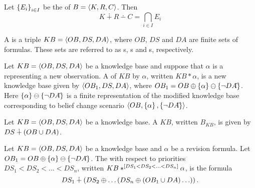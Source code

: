 \begin{defi}
Let $\left\{ E_i\right\}_{i\in I}$ be the  of $B=\left\langle K,R,C\right\rangle$. Then
\begin{equation}
K\dotplus R\dotminus C=\displaystyle\bigcap_{i\in I}E_i
\end{equation}
\cite{conf/fedcsis/KorpusikLM12}
\end{defi}

\begin{defi}
A  is a triple $KB=\left\langle OB,DS,DA\right\rangle$, where $OB$, $DS$ and $DA$ are finite sets of formulas. These sets are referred to as s, s and s, respectively.
\cite{conf/fedcsis/KorpusikLM12}
\end{defi}

\begin{defi}
Let $KB=\left\langle OB,DS,DA\right\rangle$ be a knowledge base and suppose that $\alpha$ is a  representing a new observation. A  of $KB$ by $\alpha$, written $KB\ast\alpha$, is a new knowledge base given by $\left\langle OB_1,DS,DA\right\rangle$, where $OB_1=OB\oplus\left\{ \alpha\right\}\ominus\left\{ \neg DA\hat{}\right\}$. Here $\left\{ \alpha\right\}\ominus\left\{ \neg DA\hat{}\right\}$ is a finite representation of the modified knowledge base corresponding to belief change scenario $\left\langle OB,\left\{ \alpha\right\},\left\{ \neg DA\hat{}\right\}\right\rangle$.
\cite{conf/fedcsis/KorpusikLM12}
\end{defi}

\begin{defi}
Let $KB=\left\langle OB,DS,DA\right\rangle$ be a knowledge base. A  $KB$, written $B_{KB}$, is given
by $DS\dotplus\left( OB\cup DA\right)$.
\cite{conf/fedcsis/KorpusikLM12}
\end{defi}

\begin{defi}
Let $KB=\left\langle OB,DS,DA\right\rangle$ be a knowledge base and $\alpha$ be a revision formula. Let $OB_1=OB\oplus\left\{ \alpha\right\}\ominus\left\{ \neg DA\hat{}\right\}$. The  with respect to priorities $DS_1<DS_2<\ldots<DS_n$, written $KB\ast^{\left[ DS_1<DS_2<\ldots<DS_n\right]}\alpha$, is the formula
\begin{equation}
DS_1\dotplus\left( DS_2\oplus\ldots\left( DS_n\oplus (OB_1\cup DA)\ldots\right)\right).
\end{equation}
\cite{}
\end{defi}

